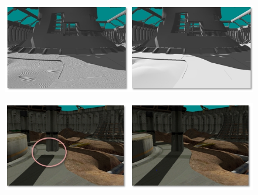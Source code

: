 \begin{figure}
	\begin{center}
    \includegraphics[width=1\textwidth]{res/img/shadow-acne1/image.jpg}
    \caption{}
	\end{center}
	\label{fig:self-shadowing}
\end{figure}
\begin{figure}
	\begin{center}
    \includegraphics[width=1\textwidth]{res/img/peter-panning1/image.jpg}
    \caption{}
	\end{center}
	\label{fig:peter-panning}
\end{figure}


